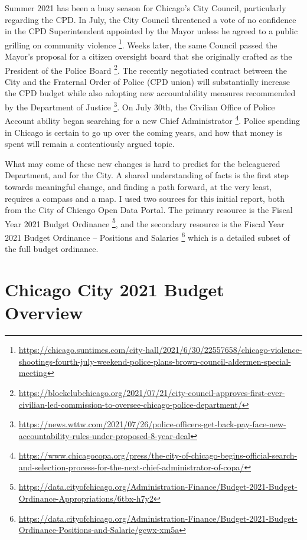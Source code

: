\documentclass[
]{article}
\begin{document}
Summer 2021 has been a busy season for Chicago's City Council,
particularly regarding the CPD. In July, the City Council threatened a
vote of no confidence in the CPD Superintendent appointed by the Mayor
unless he agreed to a public grilling on community violence \footnote{\url{https://chicago.suntimes.com/city-hall/2021/6/30/22557658/chicago-violence-shootings-fourth-july-weekend-police-plans-brown-council-aldermen-special-meeting}}.
Weeks later, the same Council passed the Mayor's proposal for a citizen
oversight board that she originally crafted as the President of the
Police Board \footnote{\url{https://blockclubchicago.org/2021/07/21/city-council-approves-first-ever-civilian-led-commission-to-oversee-chicago-police-department/}}.
The recently negotiated contract between the City and the Fraternal
Order of Police (CPD union) will substantially increase the CPD budget
while also adopting new accountability measures recommended by the
Department of Justice \footnote{\url{https://news.wttw.com/2021/07/26/police-officers-get-back-pay-face-new-accountability-rules-under-proposed-8-year-deal}}.
On July 30th, the Civilian Office of Police Account ability began
searching for a new Chief Administrator \footnote{\url{https://www.chicagocopa.org/press/the-city-of-chicago-begins-official-search-and-selection-process-for-the-next-chief-administrator-of-copa/}}.
Police spending in Chicago is certain to go up over the coming years,
and how that money is spent will remain a contentiously argued topic.

What may come of these new changes is hard to predict for the
beleaguered Department, and for the City. A shared understanding of
facts is the first step towards meaningful change, and finding a path
forward, at the very least, requires a compass and a map. I used two
sources for this initial report, both from the City of Chicago Open Data
Portal. The primary resource is the Fiscal Year 2021 Budget Ordinance
\footnote{\url{https://data.cityofchicago.org/Administration-Finance/Budget-2021-Budget-Ordinance-Appropriations/6tbx-h7y2}},
and the secondary resource is the Fiscal Year 2021 Budget Ordinance --
Positions and Salaries \footnote{\url{https://data.cityofchicago.org/Administration-Finance/Budget-2021-Budget-Ordinance-Positions-and-Salarie/gcwx-xm5a}}
which is a detailed subset of the full budget ordinance.

\hypertarget{chicago-city-2021-budget-overview}{%
\section{Chicago City 2021 Budget
Overview}\label{chicago-city-2021-budget-overview}}
\end{document}
